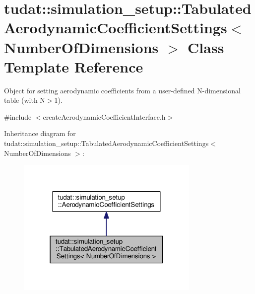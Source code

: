 \hypertarget{classtudat_1_1simulation__setup_1_1TabulatedAerodynamicCoefficientSettings}{}\section{tudat\+:\+:simulation\+\_\+setup\+:\+:Tabulated\+Aerodynamic\+Coefficient\+Settings$<$ Number\+Of\+Dimensions $>$ Class Template Reference}
\label{classtudat_1_1simulation__setup_1_1TabulatedAerodynamicCoefficientSettings}


Object for setting aerodynamic coefficients from a user-\/defined N-\/dimensional table (with N$>$1).  




{\ttfamily \#include $<$create\+Aerodynamic\+Coefficient\+Interface.\+h$>$}



Inheritance diagram for tudat\+:\+:simulation\+\_\+setup\+:\+:Tabulated\+Aerodynamic\+Coefficient\+Settings$<$ Number\+Of\+Dimensions $>$\+:
\nopagebreak
\begin{figure}[H]
\begin{center}
\leavevmode
\includegraphics[width=250pt]{classtudat_1_1simulation__setup_1_1TabulatedAerodynamicCoefficientSettings__inherit__graph}
\end{center}
\end{figure}


